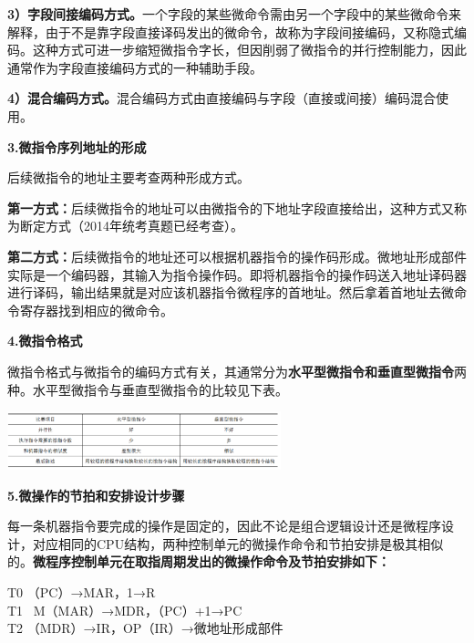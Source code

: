 \textbf{3）字段间接编码方式。}一个字段的某些微命令需由另一个字段中的某些微命令来解释，由于不是靠字段直接译码发出的微命令，故称为字段间接编码，又称隐式编码。这种方式可进一步缩短微指令字长，但因削弱了微指令的并行控制能力，因此通常作为字段直接编码方式的一种辅助手段。

\textbf{4）混合编码方式。}混合编码方式由直接编码与字段（直接或间接）编码混合使用。

{\textbf{3.微指令序列地址的形成}}

{后续微指令的地址主要考查两种形成方式。}

\textbf{第一方式：}后续微指令的地址可以由微指令的下地址字段直接给出，这种方式又称为断定方式（2014年统考真题已经考查）。

\textbf{第二方式：}后续微指令的地址还可以根据机器指令的操作码形成。微地址形成部件实际是一个编码器，其输入为指令操作码。即将机器指令的操作码送入地址译码器进行译码，输出结果就是对应该机器指令微程序的首地址。然后拿着首地址去微命令寄存器找到相应的微命令。

{\textbf{4.微指令格式}}

微指令格式与微指令的编码方式有关，其通常分为\textbf{水平型微指令和垂直型微指令}两种。水平型微指令与垂直型微指令的比较见下表。

\includegraphics[width=3.12500in,height=0.66667in]{png-jpeg-pics/F153F990ACA74EB73925D3D13D61CDF4.png}

{\textbf{5.微操作的节拍和安排设计步骤}}

每一条机器指令要完成的操作是固定的，因此不论是组合逻辑设计还是微程序设计，对应相同的CPU结构，两种控制单元的微操作命令和节拍安排是极其相似的。\textbf{微程序控制单元在取指周期发出的微操作命令及节拍安排如下：}

T0 （PC）→MAR，1→R\\
T1 ~M（MAR）→MDR，（PC）+1→PC\\
T2 （MDR）→IR，OP（IR）→微地址形成部件
